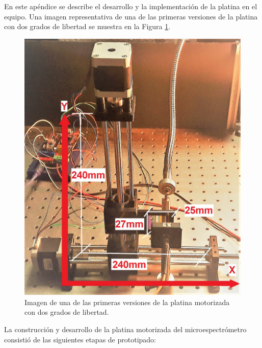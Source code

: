 \singlespacing
{}
\label{chap:platine}

\pagestyle{plain}

\hspace{0.5cm}En este apéndice se describe el desarrollo y la implementación de la platina en el equipo. Una imagen representativa de una de las primeras versiones de la platina con dos grados de libertad se muestra en la Figura \ref{fig:plato0}.


\begin{figure}[H]
	\centering
	\includegraphics[scale=0.16]{Figs/microespectrometro/stageearly.jpg}
	\caption{Imagen de una de las primeras versiones de la platina motorizada con dos grados de libertad.}
	\label{fig:plato0}
\end{figure}


La construcción y desarrollo de la platina motorizada del microespectrómetro consistió de las siguientes etapas de prototipado:

